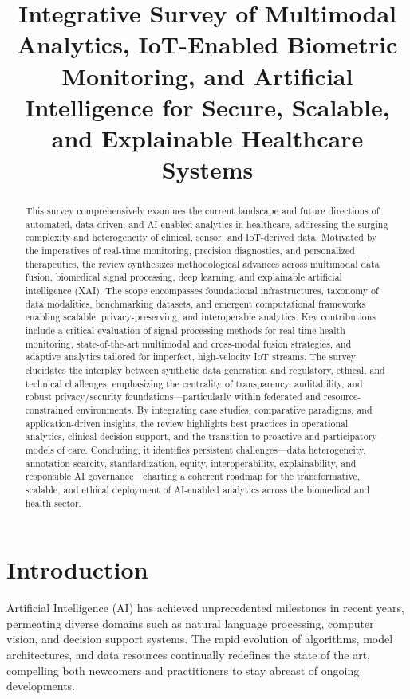 \documentclass[sigconf]{acmart}
\title{Integrative Survey of Multimodal Analytics, IoT-Enabled Biometric Monitoring, and Artificial Intelligence for Secure, Scalable, and Explainable Healthcare Systems}
\begin{document}
\begin{abstract}
This survey comprehensively examines the current landscape and future directions of automated, data-driven, and AI-enabled analytics in healthcare, addressing the surging complexity and heterogeneity of clinical, sensor, and IoT-derived data. Motivated by the imperatives of real-time monitoring, precision diagnostics, and personalized therapeutics, the review synthesizes methodological advances across multimodal data fusion, biomedical signal processing, deep learning, and explainable artificial intelligence (XAI). The scope encompasses foundational infrastructures, taxonomy of data modalities, benchmarking datasets, and emergent computational frameworks enabling scalable, privacy-preserving, and interoperable analytics. Key contributions include a critical evaluation of signal processing methods for real-time health monitoring, state-of-the-art multimodal and cross-modal fusion strategies, and adaptive analytics tailored for imperfect, high-velocity IoT streams. The survey elucidates the interplay between synthetic data generation and regulatory, ethical, and technical challenges, emphasizing the centrality of transparency, auditability, and robust privacy/security foundations—particularly within federated and resource-constrained environments. By integrating case studies, comparative paradigms, and application-driven insights, the review highlights best practices in operational analytics, clinical decision support, and the transition to proactive and participatory models of care. Concluding, it identifies persistent challenges—data heterogeneity, annotation scarcity, standardization, equity, interoperability, explainability, and responsible AI governance—charting a coherent roadmap for the transformative, scalable, and ethical deployment of AI-enabled analytics across the biomedical and health sector.
\end{abstract}

\maketitle

\section{Introduction}

Artificial Intelligence (AI) has achieved unprecedented milestones in recent years, permeating diverse domains such as natural language processing, computer vision, and decision support systems. The rapid evolution of algorithms, model architectures, and data resources continually redefines the state of the art, compelling both newcomers and practitioners to stay abreast of ongoing developments.
\end{document}
